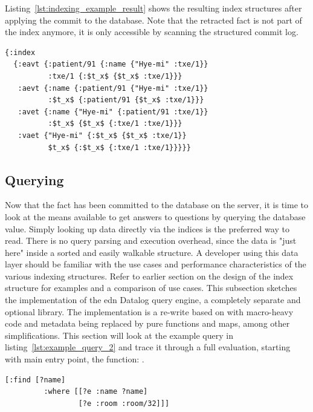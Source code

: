 Listing~\ref{lst:indexing_example_result} shows the resulting index structures after applying the commit to the database. Note that the retracted fact is not part of the index anymore, it is only accessible by scanning the structured commit log.

\begin{lstlisting}[label={lst:indexing_example_result},caption=Fully populated indices after transacting]
{:index
  {:eavt {:patient/91 {:name {"Hye-mi" :txe/1}}
          :txe/1 {:$t_x$ {$t_x$ :txe/1}}}
   :aevt {:name {:patient/91 {"Hye-mi" :txe/1}}
          :$t_x$ {:patient/91 {$t_x$ :txe/1}}}
   :avet {:name {"Hye-mi" {:patient/91 :txe/1}}
          :$t_x$ {$t_x$ {:txe/1 :txe/1}}}
   :vaet {"Hye-mi" {:$t_x$ {$t_x$ :txe/1}}
          $t_x$ {:$t_x$ {:txe/1 :txe/1}}}}}
\end{lstlisting}



\subsection{Querying}

Now that the fact has been committed to the database on the server, it is time to look at the means available to get answers to questions by querying the database value. Simply looking up data directly via the indices is the preferred way to read. There is no query parsing and execution overhead, since the data is "just here" inside a sorted and easily walkable structure. A developer using this data layer should be familiar with the use cases and performance characteristics of the various indexing structures. Refer to earlier section on the design of the index structure for examples and a comparison of use cases. This subsection sketches the implementation of the edn Datalog query engine, a completely separate and optional library. The implementation is a re-write based on \cite{rubin15aosadb} with macro-heavy code and metadata being replaced by pure functions and maps, among other simplifications. This section will look at the example query in listing~\ref{lst:example_query_2} and trace it through a full evaluation, starting with main entry point, the  function: .

\begin{lstlisting}[label={lst:example_query_2},morekeywords={e,name,find,where,room,32},caption="Who's in room no. 32?"]
        [:find [?name]
         :where [[?e :name ?name]
                 [?e :room :room/32]]]
\end{lstlisting}

